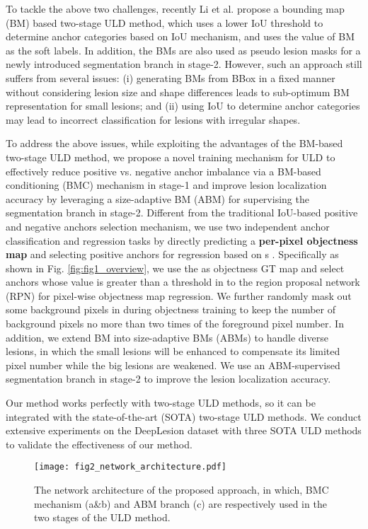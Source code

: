 \documentclass[runningheads]{llncs}
\begin{document}
To tackle the above two challenges, recently Li et al. \cite{li2020bounding} propose a bounding map (BM) based two-stage ULD method, which uses a lower IoU threshold to determine anchor categories based on IoU mechanism, and uses the value of BM as the soft labels. In addition, the BMs are also used as pseudo lesion masks for a newly introduced segmentation branch in stage-2. However, such an approach still suffers from several issues: (i) generating BMs from BBox in a fixed manner without considering lesion size and shape differences leads to sub-optimum BM representation for small lesions; and (ii) using IoU to determine anchor categories may lead to incorrect classification for lesions with irregular shapes.




To address the above issues, while exploiting the advantages of the BM-based two-stage ULD method, we propose a novel training mechanism for ULD to effectively reduce positive vs. negative anchor imbalance via a BM-based conditioning (BMC) mechanism in stage-1 and improve lesion localization accuracy by leveraging a size-adaptive BM (ABM) for supervising the segmentation branch in stage-2.
Different from the traditional IoU-based positive and negative anchors selection mechanism, we use two independent anchor classification and regression tasks by directly predicting a \textbf{per-pixel objectness map} and selecting positive anchors for regression based on s \cite{li2020bounding}. Specifically as shown in Fig. \ref{fig:fig1_overview}, we use the  \cite{li2020bounding} as objectness GT map and select anchors whose value is greater than a threshold  in  to the region proposal network (RPN) for pixel-wise objectness map regression. We further randomly mask out some background pixels in  during objectness training to keep the number of background pixels no more than two times of the foreground pixel number.
In addition, we extend BM into size-adaptive BMs (ABMs) to handle diverse lesions, in which the small lesions will be enhanced to compensate its limited pixel number while the big lesions are weakened. We use an ABM-supervised segmentation branch in stage-2 to improve the lesion localization accuracy.

Our method works perfectly with two-stage ULD methods, so it can be integrated with the state-of-the-art (SOTA) two-stage ULD methods. We conduct extensive experiments on the DeepLesion dataset \cite{yan18deeplesion} with three SOTA ULD methods to validate the effectiveness of our method.
\begin{figure}[t]
\centering
\setlength{\abovecaptionskip}{0.cm}

\texttt{[image: fig2\_network\_architecture.pdf]}
\caption{The network architecture of the proposed approach, in which, BMC mechanism (a\&b) and ABM branch (c) are respectively used in the two stages of the ULD method.}

\label{fig:fig2_network_architecture}
\end{figure}
\end{document}
